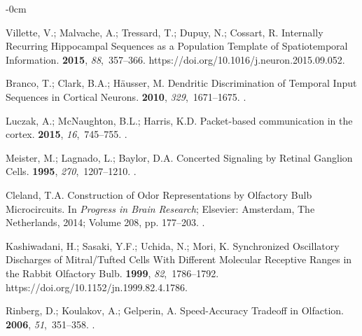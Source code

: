 \documentclass[brainsci, %
               review,accept,pdftex,moreauthors
               ]{Definitions/mdpi}
\begin{document}
\begin{adjustwidth}{-\extralength}{0cm}
\begin{thebibliography}{999}
Villette, V.; Malvache, A.; Tressard, T.; Dupuy, N.; Cossart, R.
\newblock Internally {Recurring} {Hippocampal} {Sequences} as a {Population}
  {Template} of {Spatiotemporal} {Information}.
 {\bf 2015}, {\em 88},~357--366.
 {{https://doi.org/10.1016/j.neuron.2015.09.052}}.

Branco, T.; Clark, B.A.; Häusser, M.
\newblock Dendritic {Discrimination} of {Temporal} {Input} {Sequences} in
  {Cortical} {Neurons}.
 {\bf 2010}, {\em 329},~1671--1675.
.

Luczak, A.; McNaughton, B.L.; Harris, K.D.
\newblock Packet-based communication in the cortex.
 {\bf 2015}, {\em 16},~745--755.
.

Meister, M.; Lagnado, L.; Baylor, D.A.
\newblock Concerted {Signaling} by {Retinal} {Ganglion} {Cells}.
 {\bf 1995}, {\em 270},~1207--1210.
.

Cleland, T.A.
\newblock Construction of {Odor} {Representations} by {Olfactory} {Bulb}
  {Microcircuits}. In {\em Progress in {Brain} {Research}}; Elsevier:  {Amsterdam, The Netherlands,} %
  2014;
  Volume 208, pp. 177--203.
.

Kashiwadani, H.; Sasaki, Y.F.; Uchida, N.; Mori, K.
\newblock Synchronized {Oscillatory} {Discharges} of {Mitral}/{Tufted} {Cells}
  {With} {Different} {Molecular} {Receptive} {Ranges} in the {Rabbit}
  {Olfactory} {Bulb}.
 {\bf 1999}, {\em 82},~1786--1792.\linebreak
  {{https://doi.org/10.1152/jn.1999.82.4.1786}}.

Rinberg, D.; Koulakov, A.; Gelperin, A.
\newblock Speed-{Accuracy} {Tradeoff} in {Olfaction}.
 {\bf 2006}, {\em 51},~351--358.\linebreak
{}.


\end{thebibliography}
\end{adjustwidth}
\end{document}
